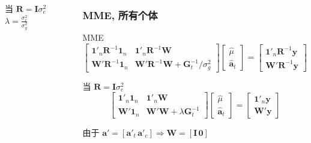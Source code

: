 \documentclass[serif,aspectratio=169]{beamer}
\begin{document}
\begin{frame}
\begin{columns}
\begin{frame}
\begin{block}{当 $\mathbf{R=I}\sigma_e^2$}
    $\lambda=\frac{\sigma_e^2}{\sigma_g^2}$
  \end{block}
\end{frame}


\begin{frame}
  \frametitle{MME, 所有个体}
  \begin{block}{MME}
    $$
    \left[\begin{array}{ll}
        \mathbf{1}'_n\mathbf{R}^{-1}\mathbf{1}_n & \mathbf{1}'_n\mathbf{R}^{-1}\mathbf{W}\\
        \mathbf{W}'\mathbf{R}^{-1}\mathbf{1}_n & \mathbf{W}'\mathbf{R}^{-1}\mathbf{W}+\mathbf{G}^{-1}_t/\sigma_g^2
      \end{array}\right]
    \left[\begin{array}{c}
        \hat{\mu}\\\hat{\mathbf{a}}_t
      \end{array}\right]=
    \left[\begin{array}{c}
        \mathbf{1}'_n\mathbf{R}^{-1}\mathbf{y}\\\mathbf{W}'\mathbf{R}^{-1}\mathbf{y}
      \end{array}\right]
    $$
  \end{block}
  
  \begin{block}{当 $\mathbf{R=I}\sigma_e^2$}
    $$
    \left[\begin{array}{ll}
        \mathbf{1}'_n\mathbf{1}_n & \mathbf{1}'_n\mathbf{W}\\
        \mathbf{W}'\mathbf{1}_n & \mathbf{W'W}+\lambda\mathbf{G}^{-1}_t
      \end{array}\right]
    \left[\begin{array}{c}
        \hat{\mu}\\\hat{\mathbf{a}}_t
      \end{array}\right]=
    \left[\begin{array}{c}
        \mathbf{1}'_n\mathbf{y}\\\mathbf{W}'\mathbf{y}
      \end{array}\right]
    $$

    由于 $\mathbf{a}'=[\mathbf{a}'_t\,\mathbf{a}'_c]\Rightarrow\mathbf{W}=[\mathbf{I\,0}]$
  \end{block}
\end{frame}



\end{columns}
\end{frame}
\end{document}

